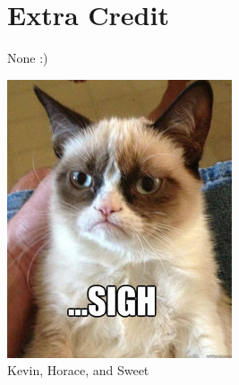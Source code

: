 \documentclass{article}
\begin{document}
\section{Extra Credit}
  None :)

\includegraphics{3tlx0s.jpg} \\
Kevin, Horace, and Sweet
\end{document}
